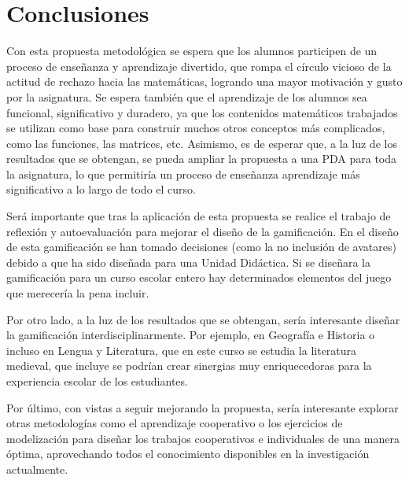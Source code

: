 
\chapter{Conclusiones}
\label{chap:conclusiones}

Con esta propuesta metodológica se espera que los alumnos participen de un proceso de enseñanza y aprendizaje divertido, que rompa el círculo vicioso de la actitud de rechazo hacia las matemáticas, logrando una mayor motivación y gusto por la asignatura.
%
Se espera también que el aprendizaje de los alumnos sea funcional, significativo y duradero, ya que los contenidos matemáticos trabajados se utilizan como base para construir muchos otros conceptos más complicados, como las funciones, las matrices, etc.
Asimismo, es de esperar que, a la luz de los resultados que se obtengan, se pueda ampliar la propuesta a una \gls{PDA} para toda la asignatura, lo que permitiría un proceso de enseñanza aprendizaje más significativo a lo largo de todo el curso.

Será importante que tras la aplicación de esta propuesta se realice el trabajo de reflexión y autoevaluación para mejorar el diseño de la gamificación.
%
En el diseño de esta gamificación se han tomado decisiones (como la no inclusión de avatares) debido a que ha sido diseñada para una Unidad Didáctica.
%
Si se diseñara la gamificación para un curso escolar entero hay determinados elementos del juego que merecería la pena incluir.


Por otro lado, a la luz de los resultados que se obtengan, sería interesante diseñar la gamificación interdisciplinarmente.
%
Por ejemplo, en Geografía e Historia o incluso en Lengua y Literatura, que en este curso se estudia la literatura medieval, que incluye  se podrían crear sinergias muy enriquecedoras para la experiencia escolar de los estudiantes.

Por último, con vistas a seguir mejorando la propuesta, sería interesante explorar otras metodologías como el aprendizaje cooperativo o los ejercicios de modelización para diseñar los trabajos cooperativos e individuales de una manera óptima, aprovechando todos el conocimiento disponibles en la investigación actualmente.

